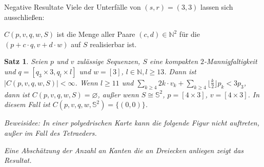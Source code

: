 \documentclass[10pt, notheorems]{beamer}
\newtheorem{theorem}{Satz}[section]
\let\emptyset\varnothing
\newcommand{\set}[1]{\{ #1 \}}
\newcommand{\nats}{\mathbb{N}}
\newcommand{\sphere}{\mathbb{S}}
\newcommand{\hdef}[1]{\textcolor{darkred2}{#1}}
\begin{document}
\begin{frame}{Negative Resultate}
  Viele der Unterfälle von $(s, r) = (3, 3)$ lassen sich ausschließen:
  \begin{definition}
    \hdef{$C(p, v, q, w, S)$} ist die Menge aller Paare $(c, d) \in \nats^2$ für die $(p + c \cdot q, v + d \cdot w)$ auf $S$ realisierbar ist.
  \end{definition}
  \pause
  \begin{theorem}
    Seien  $p$ und $v$ zulässige Sequenzen, $S$ eine kompakten $2$-Mannigfaltigkeit und $q = [q_3 \times 3, q_l \times l]$ und $w = [3]$, $l \in \nats, l \geq 13$. Dann ist $|C(p, v, q, w, S)| < \infty$. Wenn $l \geq 11$ und $\sum_{k \geq 4} 2k \cdot v_k + \sum_{k \geq 4} \lfloor \tfrac{k}{2} \rfloor p_k < 3p_3$, dann ist $C(p, v, q, w, S) = \emptyset$, außer wenn $S \cong \sphere^2$, $p = [4 \times 3]$, $v = [4 \times 3]$. In diesem Fall ist $C(p, v, q, w, \sphere^2) = \set{(0, 0)}$.

  \pause
    Beweisidee: In einer polyedrischen Karte kann die folgende Figur nicht auftreten, außer im Fall des Tetraeders.

    { \centering
      \par
    }
    Eine Abschätzung der Anzahl an Kanten die an Dreiecken anliegen zeigt das Resultat.
  \end{theorem}
\end{frame}
\end{document}
